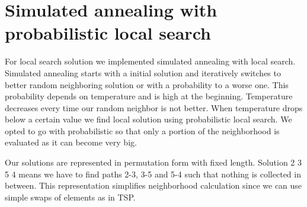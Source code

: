 \documentclass[a4paper, 12pt]{article}
\begin{document}
\newpage

\section{Simulated annealing with probabilistic local search}

For local search solution we implemented simulated annealing with local search.
Simulated annealing starts with a initial solution and iteratively switches to
better random neighboring solution or with a probability to a worse one. This
probability depends on temperature and is high at the beginning. Temperature
decreases every time our random neighbor is not better. When temperature drops
below a certain value we find local solution using probabilistic local search.
We opted to go with probabilistic so that only a portion of the neighborhood is
evaluated as it can become very big.

Our solutions are represented in permutation form with fixed length. Solution
2 3 5 4 means we have to find paths 2-3, 3-5 and 5-4 such that nothing is
collected in between. This representation simplifies neighborhood calculation
since we can use simple swaps of elements as in TSP.
\end{document}
